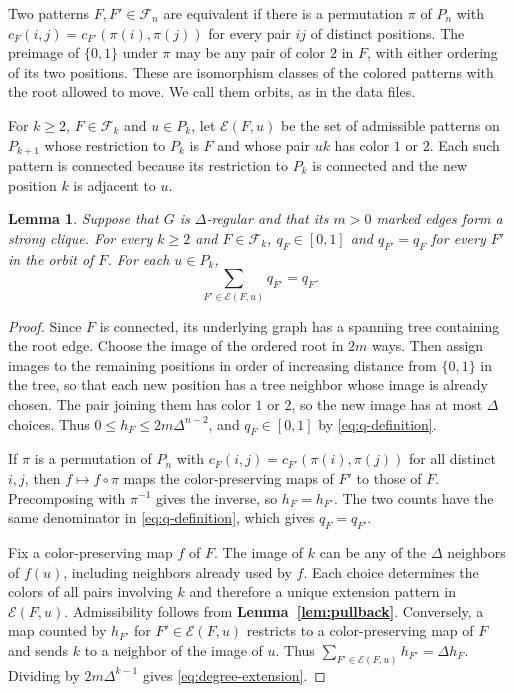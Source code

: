 \documentclass[preprint,11pt,numbers]{elsarticle-arxiv}
\numberwithin{equation}{section}
\newtheorem{lemma}[theorem]{Lemma}
\theoremstyle{definition}
\begin{document}
Two patterns $F,F'\in\mathcal F_n$ are equivalent if there is a
permutation $\pi$ of $P_n$ with
$c_F(i,j)=c_{F'}(\pi(i),\pi(j))$ for every pair $ij$ of distinct
positions. The preimage of $\{0,1\}$ under $\pi$ may be any pair of
color $2$ in $F$, with either ordering of its two positions. These
are isomorphism classes of the colored patterns with the root allowed
to move. We call them orbits, as in the data files.

For $k\geq2$, $F\in\mathcal F_k$ and $u\in P_k$, let
$\mathcal E(F,u)$ be the set of admissible patterns on $P_{k+1}$ whose
restriction to $P_k$ is $F$ and whose pair $uk$ has color $1$ or $2$.
Each such pattern is connected because its restriction to $P_k$ is
connected and the new position $k$ is adjacent to $u$.

\begin{lemma}\label{lem:coordinates}\label{lem:degree}
Suppose that $G$ is $\Delta$-regular and that its $m>0$ marked edges
form a strong clique. For every $k\geq2$ and $F\in\mathcal F_k$,
$q_F\in[0,1]$ and $q_{F'}=q_F$ for every $F'$ in the orbit of $F$.
For each $u\in P_k$,
\begin{equation}\label{eq:degree-extension}
 \sum_{F'\in\mathcal E(F,u)}q_{F'}=q_F.
\end{equation}
\end{lemma}

\begin{proof}
Since $F$ is connected, its underlying graph has a spanning tree
containing the root edge. Choose the image of the ordered root in
$2m$ ways. Then assign images to the remaining positions in order of
increasing distance from $\{0,1\}$ in the tree, so that each new
position has a tree neighbor whose image is already chosen. The pair
joining them has color $1$ or $2$, so the new image has at most
$\Delta$ choices. Thus $0\leq h_F\leq 2m\Delta^{n-2}$, and
$q_F\in[0,1]$ by \eqref{eq:q-definition}.

If $\pi$ is a permutation of $P_n$ with
$c_F(i,j)=c_{F'}(\pi(i),\pi(j))$ for all distinct $i,j$, then
$f\mapsto f\circ\pi$ maps the color-preserving maps of $F'$ to those
of $F$. Precomposing with $\pi^{-1}$ gives the inverse, so
$h_F=h_{F'}$. The two counts have the same denominator in
\eqref{eq:q-definition}, which gives $q_F=q_{F'}$.

Fix a color-preserving map $f$ of $F$. The image of $k$ can be any
of the $\Delta$ neighbors of $f(u)$, including neighbors already
used by $f$. Each choice determines the colors of all pairs involving
$k$ and therefore a unique extension pattern in $\mathcal E(F,u)$.
Admissibility follows from \textbf{Lemma~\ref{lem:pullback}}.
Conversely, a map counted by $h_{F'}$ for $F'\in\mathcal E(F,u)$
restricts to a color-preserving map of $F$ and sends $k$ to a neighbor
of the image of $u$. Thus
$\sum_{F'\in\mathcal E(F,u)}h_{F'}=\Delta h_F$.
Dividing by $2m\Delta^{k-1}$ gives \eqref{eq:degree-extension}.
\end{proof}
\end{document}
